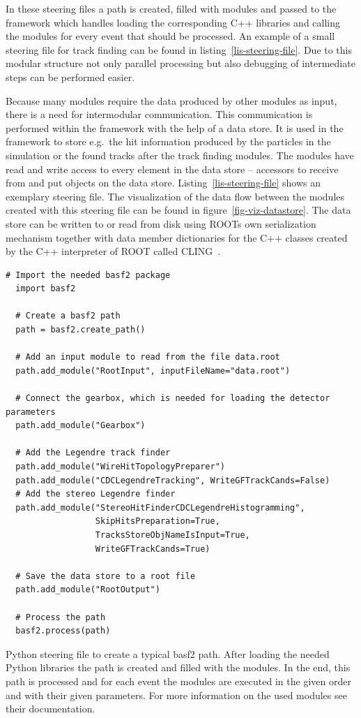 In these steering files a path is created, filled with modules and passed to the framework which handles loading the corresponding C++ libraries and calling the modules for every event that should be processed. An example of a small steering file for track finding can be found in listing~\ref{lis-steering-file}. Due to this modular structure not only parallel processing but also debugging of intermediate steps can be performed easier.

Because many modules require the data produced by other modules as input, there is a need for intermodular communication. This communication is performed within the framework with the help of a data store. It is used in the framework to store e.g.\ the hit information produced by the particles in the simulation or the found tracks after the track finding modules. The modules have read and write access to every element in the data store -- accessors to receive from and put objects on the data store. Listing~\ref{lis-steering-file} shows an exemplary steering file. The visualization of the data flow between the modules created with this steering file can be found in figure~\ref{fig-viz-datastore}. The data store can be written to or read from disk using ROOTs own serialization mechanism together with data member dictionaries for the C++ classes created by the C++ interpreter of ROOT called CLING~\cite{cling}.

\begin{listing}
 \begin{lstlisting}[style=customP]
  # Import the needed basf2 package
  import basf2

  # Create a basf2 path
  path = basf2.create_path()

  # Add an input module to read from the file data.root
  path.add_module("RootInput", inputFileName="data.root")
  
  # Connect the gearbox, which is needed for loading the detector parameters
  path.add_module("Gearbox")

  # Add the Legendre track finder
  path.add_module("WireHitTopologyPreparer")
  path.add_module("CDCLegendreTracking", WriteGFTrackCands=False)
  # Add the stereo Legendre finder
  path.add_module("StereoHitFinderCDCLegendreHistogramming",
                  SkipHitsPreparation=True,
                  TracksStoreObjNameIsInput=True,
                  WriteGFTrackCands=True)
  
  # Save the data store to a root file
  path.add_module("RootOutput")

  # Process the path
  basf2.process(path)

 \end{lstlisting}
 \caption[Python steering file to create a typical basf2 path.]{Python steering file to create a typical basf2 path. After loading the needed Python libraries the path is created and filled with the modules. In the end, this path is processed and for each event the modules are executed in the given order and with their given parameters. For more information on the used modules see their documentation.}
 \label{lis-steering-file}
\end{listing}


